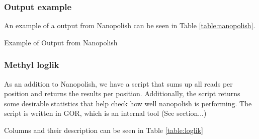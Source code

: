 \subsubsection{Output example}
An example of a output from Nanopolish can be seen in Table \ref{table:nanopolish}.
\begin {table}[h]
    \caption{Example of Output from Nanopolish}
    \begin{center}
    \label{table:nanopolish}
    \end{center}
\end{table}

\subsubsection{Methyl loglik}
As an addition to Nanopolish, we have a script that sums up all reads per position and returns the results per position. Additionally, the script returns some desirable statistics that help check how well nanopolish is performing. The script is written in GOR, which is an internal tool (See section...)%

Columns and their description can be seen in Table \ref{table:loglik} %

